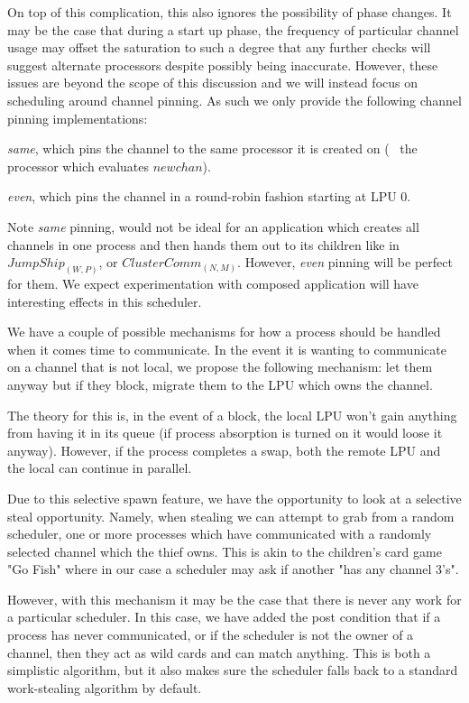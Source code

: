 On top of this complication, this also ignores the possibility of phase changes.
It may be the case that during a start up phase, the frequency of particular 
channel usage may offset the saturation to such a degree that any further 
checks will suggest alternate processors despite possibly being inaccurate.
However, these issues are beyond the scope of this discussion and we will 
instead focus on scheduling around channel pinning. As such we only provide the
following channel pinning implementations: 
\begin{inparaenum}
\item \emph{same}, which pins the channel to the same processor it is created 
    on (\ie~ the processor which evaluates $newchan$).
\item \emph{even}, which pins the channel in a round-robin fashion starting at
    LPU $0$.
\end{inparaenum}

Note \emph{same} pinning, would not be ideal for an application which creates
all channels in one process and then hands them out to its children like in
$JumpShip_{(W,P)}$, or $ClusterComm_{(N,M)}$. However, \emph{even} pinning will
be perfect for them. We expect experimentation with composed application will
have interesting effects in this scheduler.

We have a couple of possible mechanisms for how a process should be handled when
it comes time to communicate. In the event it is wanting to communicate on a 
channel that is not local, we propose the following mechanism: let them anyway
but if they block, migrate them to the LPU which owns the channel.

The theory for this is, in the event of a block, the local LPU won't gain 
anything from having it in its queue (if process absorption is turned on it would 
loose it anyway). However, if the process completes a swap, both the remote
LPU and the local can continue in parallel.

Due to this selective spawn feature, we have the opportunity to look at a 
selective steal opportunity. Namely, when stealing we can attempt to grab from
a random scheduler, one or more processes which have communicated with a 
randomly selected channel which the thief owns. This is akin to the children's
card game "Go Fish" where in our case a scheduler may ask if another "has any
channel 3's".

However, with this mechanism it may be the case that there is never any work
for a particular scheduler. In this case, we have added the post condition that
if a process has never communicated, or if the scheduler is not the owner of a
channel, then they act as wild cards and can match anything. This is both a 
simplistic algorithm, but it also makes sure the scheduler falls back to a 
standard work-stealing algorithm by default.

